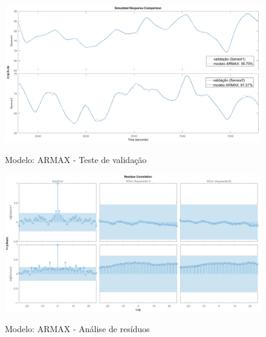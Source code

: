 \begin{figure}[h]
	\caption{Modelo: ARMAX - Teste de validação}
	\begin{center}
		\includegraphics[width=1.00\textwidth]{./5_images/tclabsp-models-ARMAX-compare.png} 
		\label{fig:tclabsp-models-armax-compare}
	\end{center}
	\centering
\end{figure}

\begin{figure}[h]
	\caption{Modelo: ARMAX - Análise de resíduos}
	\begin{center}
		\includegraphics[width=1.00\textwidth]{./5_images/tclabsp-models-ARMAX-resid.png} 
		\label{fig:tclabsp-models-armax-resid}
	\end{center}
	\centering
\end{figure}

